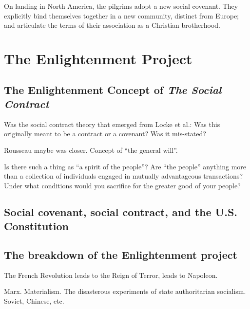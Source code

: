 \documentclass[
]{book}
\begin{document}
On landing in North America, the pilgrims adopt a new social covenant. They explicitly bind themselves together in a new community, distinct from Europe; and articulate the terms of their association as a Christian brotherhood.

\hypertarget{part-the-enlightenment-project}{%
\part{The Enlightenment Project}\label{part-the-enlightenment-project}}

\hypertarget{the-enlightenment-concept-of-the-social-contract}{%
\chapter{\texorpdfstring{The Enlightenment Concept of \emph{The Social Contract}}{The Enlightenment Concept of The Social Contract}}\label{the-enlightenment-concept-of-the-social-contract}}

Was the social contract theory that emerged from Locke et al.: Was this
originally meant to be a contract or a covenant? Was it mis-stated?

Rousseau maybe was closer. Concept of ``the general will''.

Is there such a thing as ``a spirit of the people''?
Are ``the people'' anything more than a collection of individuals engaged in mutually advantageous transactions?
Under what conditions would you sacrifice for the greater good of your people?

\hypertarget{social-covenant-social-contract-and-the-u.s.-constitution}{%
\chapter{Social covenant, social contract, and the U.S. Constitution}\label{social-covenant-social-contract-and-the-u.s.-constitution}}

\hypertarget{the-breakdown-of-the-enlightenment-project}{%
\chapter{The breakdown of the Enlightenment project}\label{the-breakdown-of-the-enlightenment-project}}

The French Revolution leads to the Reign of Terror, leads to Napoleon.

Marx. Materialism. The disasterous experiments of state authoritarian socialism. Soviet, Chinese, etc.
\end{document}
